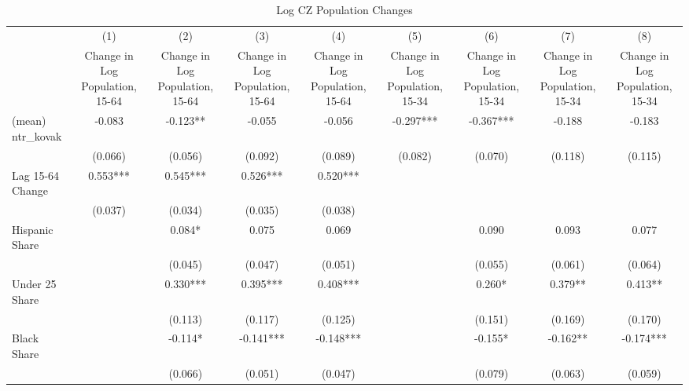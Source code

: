 \begin{table}[htbp]\centering
\def\sym#1{\ifmmode^{#1}\else\(^{#1}\)\fi}
\caption{Log CZ Population Changes}
\begin{tabular}{l*{8}{c}}
\toprule
                    &\multicolumn{1}{c}{(1)}&\multicolumn{1}{c}{(2)}&\multicolumn{1}{c}{(3)}&\multicolumn{1}{c}{(4)}&\multicolumn{1}{c}{(5)}&\multicolumn{1}{c}{(6)}&\multicolumn{1}{c}{(7)}&\multicolumn{1}{c}{(8)}\\
                    &\multicolumn{1}{c}{Change in Log Population, 15-64}&\multicolumn{1}{c}{Change in Log Population, 15-64}&\multicolumn{1}{c}{Change in Log Population, 15-64}&\multicolumn{1}{c}{Change in Log Population, 15-64}&\multicolumn{1}{c}{Change in Log Population, 15-34}&\multicolumn{1}{c}{Change in Log Population, 15-34}&\multicolumn{1}{c}{Change in Log Population, 15-34}&\multicolumn{1}{c}{Change in Log Population, 15-34}\\
\midrule
(mean) ntr\_kovak    &   -0.083   &   -0.123** &   -0.055   &   -0.056   &   -0.297***&   -0.367***&   -0.188   &   -0.183   \\
                    &  (0.066)   &  (0.056)   &  (0.092)   &  (0.089)   &  (0.082)   &  (0.070)   &  (0.118)   &  (0.115)   \\
\addlinespace
Lag 15-64 Change    &    0.553***&    0.545***&    0.526***&    0.520***&            &            &            &            \\
                    &  (0.037)   &  (0.034)   &  (0.035)   &  (0.038)   &            &            &            &            \\
\addlinespace
Hispanic Share      &            &    0.084*  &    0.075   &    0.069   &            &    0.090   &    0.093   &    0.077   \\
                    &            &  (0.045)   &  (0.047)   &  (0.051)   &            &  (0.055)   &  (0.061)   &  (0.064)   \\
\addlinespace
Under 25 Share      &            &    0.330***&    0.395***&    0.408***&            &    0.260*  &    0.379** &    0.413** \\
                    &            &  (0.113)   &  (0.117)   &  (0.125)   &            &  (0.151)   &  (0.169)   &  (0.170)   \\
\addlinespace
Black Share         &            &   -0.114*  &   -0.141***&   -0.148***&            &   -0.155*  &   -0.162** &   -0.174***\\
                    &            &  (0.066)   &  (0.051)   &  (0.047)   &            &  (0.079)   &  (0.063)   &  (0.059)   \\

\end{tabular}
\end{table}
